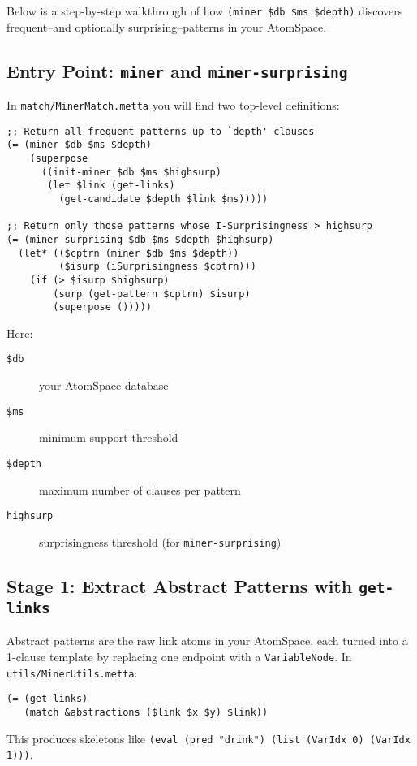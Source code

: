 Below is a step-by-step walkthrough of how \texttt{(miner \$db \$ms \$depth)} discovers frequent--and optionally surprising--patterns in your AtomSpace.

\subsection{Entry Point: \texttt{miner} and \texttt{miner-surprising}}

In \texttt{match/MinerMatch.metta} you will find two top-level definitions:

\begin{verbatim}
;; Return all frequent patterns up to `depth' clauses
(= (miner $db $ms $depth)
    (superpose
      ((init-miner $db $ms $highsurp)
       (let $link (get-links)
         (get-candidate $depth $link $ms)))))

;; Return only those patterns whose I-Surprisingness > highsurp
(= (miner-surprising $db $ms $depth $highsurp)
  (let* (($cptrn (miner $db $ms $depth))
         ($isurp (iSurprisingness $cptrn)))
    (if (> $isurp $highsurp)
        (surp (get-pattern $cptrn) $isurp)
        (superpose ()))))
\end{verbatim}

\noindent
Here:
\begin{description}
  \item[\texttt{\$db}] your AtomSpace database
  \item[\texttt{\$ms}] minimum support threshold
  \item[\texttt{\$depth}] maximum number of clauses per pattern
  \item[\texttt{highsurp}] surprisingness threshold (for \texttt{miner-surprising})
\end{description}

\subsection{Stage 1: Extract Abstract Patterns with \texttt{get-links}}

Abstract patterns are the raw link atoms in your AtomSpace, each turned into a 1-clause template by replacing one endpoint with a \texttt{VariableNode}.  In \texttt{utils/MinerUtils.metta}:

\begin{verbatim}
(= (get-links)
   (match &abstractions ($link $x $y) $link))
\end{verbatim}

\noindent
This produces skeletons like \texttt{(eval (pred "drink") (list (VarIdx 0) (VarIdx 1)))}.

